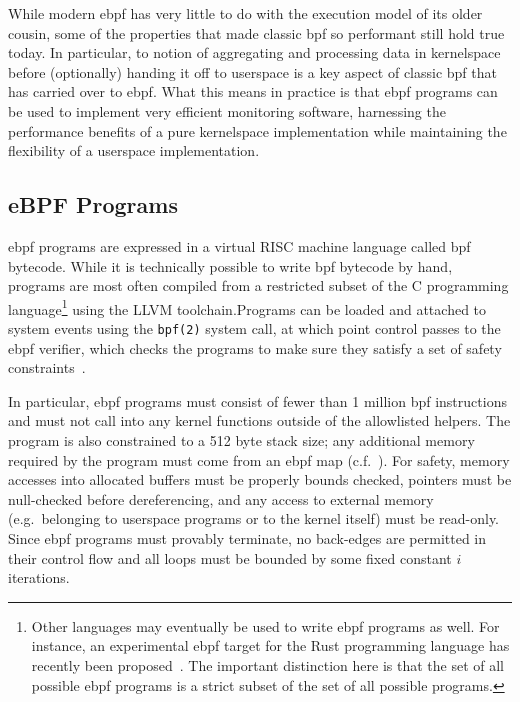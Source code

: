 While modern \gls{ebpf} has very little to do with the execution model of its older cousin, some
of the properties that made classic \gls{bpf} so performant still hold true today. In
particular, to notion of aggregating and processing data in kernelspace before
(optionally) handing it off to userspace is a key aspect of classic \gls{bpf} that has carried
over to \gls{ebpf}. What this means in practice is that \gls{ebpf} programs can be used to implement
very efficient monitoring software, harnessing the performance benefits of a pure
kernelspace implementation while maintaining the flexibility of a userspace
implementation.

\subsection{eBPF Programs}%
\label{ss:bpf-programs-bg}

\gls{ebpf} programs are expressed in a virtual RISC machine language called \gls{bpf} bytecode.  While
it is technically possible to write \gls{bpf} bytecode by hand, programs are most often compiled
from a restricted subset of the C programming language\footnote{Other languages may
eventually be used to write \gls{ebpf} programs as well.  For instance, an experimental \gls{ebpf}
target for the Rust programming language has recently been
proposed~\cite{decina2021_bpf_rust}. The important distinction here is that the set of all
possible \gls{ebpf} programs is a strict subset of the set of all possible programs.} using the
LLVM toolchain.Programs can be loaded and attached to system events using the
\texttt{bpf(2)} system call, at which point control passes to the \gls{ebpf} verifier, which
checks the programs to make sure they satisfy a set of safety
constraints~\cite{starovoitov2014_ebpf, gregg2019_bpf}.

In particular, \gls{ebpf} programs must consist of fewer than 1 million \gls{bpf}
instructions and must not call into any kernel functions outside of the allowlisted
helpers. The program is also constrained to a 512 byte stack size; any additional memory
required by the program must come from an \gls{ebpf} map (c.f.~). For
safety, memory accesses into allocated buffers must be properly bounds checked, pointers
must be null-checked before dereferencing, and any access to external memory
(e.g.~belonging to userspace programs or to the kernel itself) must be read-only. Since
\gls{ebpf} programs must provably terminate, no back-edges are permitted in their control
flow and all loops must be bounded by some fixed constant $i$ iterations.


